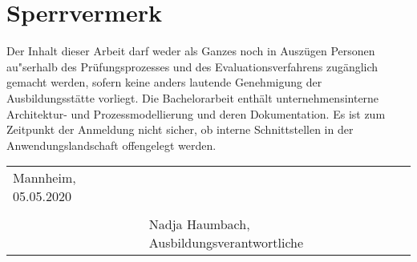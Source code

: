 \chapter*{Sperrvermerk}
Der Inhalt dieser Arbeit darf weder als Ganzes noch in Auszügen Personen au"serhalb des Prüfungsprozesses und des Evaluationsverfahrens zugänglich gemacht werden, sofern keine anders lautende Genehmigung der Ausbildungsstätte vorliegt. Die Bachelorarbeit enthält unternehmensinterne Architektur- und Prozessmodellierung und deren Dokumentation. Es ist zum Zeitpunkt der Anmeldung nicht sicher, ob interne Schnittstellen in der Anwendungslandschaft offengelegt werden.



\vspace{3cm}
\begingroup
\begin{table}[h!]
	\setlength\tabcolsep{0pt}
	\begin{tabular}{p{6.5cm}p{8.5cm}}
		Mannheim, 05.05.2020 &  \\
		& \\
		& Nadja Haumbach, Ausbildungsverantwortliche \\
	\end{tabular}
\end{table}
